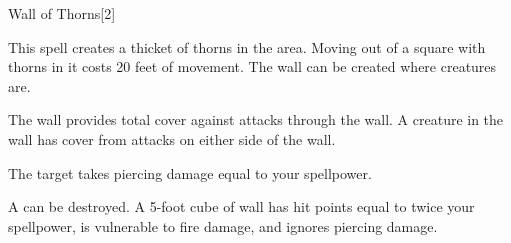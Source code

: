 \begin{spellsection}{Wall of Thorns}[2]
    \begin{spellheader}
    \end{spellheader}
    \begin{spellcontent}
        \begin{spelltargetinginfo}
        \end{spelltargetinginfo}
        \begin{spelleffects}
            \spelleffect This spell creates a thicket of thorns in the area. Moving out of a square with thorns in it costs 20 feet of movement. The wall can be created where creatures are.


            The wall provides total cover against attacks through the wall. A creature in the wall has cover from attacks on either side of the wall.
            \spelldur \durshort
        \end{spelleffects}
    \end{spellcontent}
    \begin{spellsubcontent}
        \begin{spelltargetinginfo}
        \end{spelltargetinginfo}
        \begin{spelleffects}
            \spelleffect The target takes piercing damage equal to your spellpower.
        \end{spelleffects}
    \end{spellsubcontent}
    \begin{spellfooter}
        \spellnotes A  can be destroyed. A 5-foot cube of wall has hit points equal to twice your spellpower, is vulnerable to fire damage, and ignores piercing damage.
        \physicalspellnotes
        \miscastexplode
    \end{spellfooter}
\end{spellsection}

